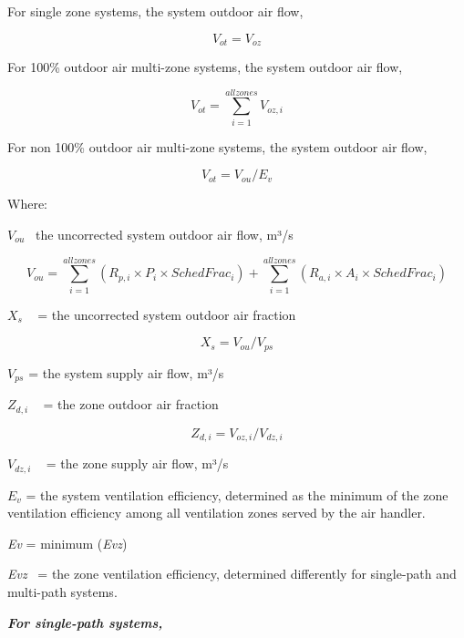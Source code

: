 For single zone systems, the system outdoor air flow,

\begin{equation}
{V_{ot}} = {V_{oz}}
\end{equation}

For 100\% outdoor air multi-zone systems, the system outdoor air flow,

\begin{equation}
{V_{ot}} = \mathop \sum \limits_{i = 1}^{allzones} {V_{oz,i}}
\end{equation}

For non 100\% outdoor air multi-zone systems, the system outdoor air flow,

\begin{equation}
{V_{ot}} = {V_{ou}}/{E_v}
\end{equation}

Where:

\({V_{ou}}\) ~the uncorrected system outdoor air flow, m³/s

\begin{equation}
{V_{ou}} = \mathop \sum \limits_{i = 1}^{allzones} ({R_{p,i}} \times {P_i} \times {SchedFrac_i}) + \mathop \sum \limits_{i = 1}^{allzones} ({R_{a,i}} \times {A_i} \times {SchedFrac_i})
\end{equation}

\({X_s}\) ~ = the uncorrected system outdoor air fraction

\begin{equation}
{X_s} = {V_{ou}}/{V_{ps}}
\end{equation}

\({V_{ps}}\) = the system supply air flow, m³/s

\({Z_{d,i}}\) ~ = the zone outdoor air fraction

\begin{equation}
{Z_{d,i}} = {V_{oz,i}}/{V_{dz,i}}
\end{equation}

\({V_{dz,i}}\) ~ = the zone supply air flow, m³/s

\({E_v}\) = the system ventilation efficiency, determined as the minimum of the zone ventilation efficiency among all ventilation zones served by the air handler.

\emph{Ev} = minimum (\emph{Evz})

\emph{Evz}~ = the zone ventilation efficiency, determined differently for single-path and multi-path systems.

\textbf{\emph{For single-path systems,}}

